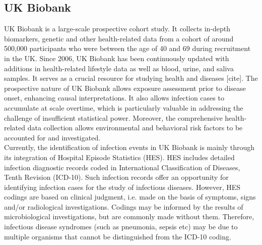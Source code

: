 \documentclass{article}
\begin{document}
\subsection{UK Biobank}
UK Biobank is a large-scale prospective cohort study. It collects in-depth biomarkers, genetic and other health-related data from a cohort of around 500,000 participants who were between the age of 40 and 69 during recruitment in the UK. Since 2006, UK Biobank has been continuously updated with additions in health-related lifestyle data as well as blood, urine, and saliva samples. It serves as a crucial resource for studying health and diseases [cite]. The prospective nature of UK Biobank allows exposure assessment prior to disease onset, enhancing causal interpretations. It also allows infection cases to accumulate at scale overtime, which is particularly valuable in addressing the challenge of insufficient statistical power. Moreover, the comprehensive health-related data collection allows environmental and behavioral risk factors to be accounted for and investigated.
\\
Currently, the identification of infection events in UK Biobank is mainly through its integration of Hospital Episode Statistics (HES). HES includes detailed infection diagnostic records coded in International Classification of Diseases, Tenth Revision (ICD-10). Such infection records offer an opportunity for identifying infection cases for the study of infectious diseases. However, HES codings are based on clinical judgment, i.e. made on the basis of symptoms, signs and/or radiological investigations. Codings may be informed by the results of microbiological investigations, but are commonly made without them. Therefore, infectious disease syndromes (such as pneumonia, sepsis etc) may be due to multiple organisms that cannot be distinguished from the ICD-10 coding.
\end{document}

